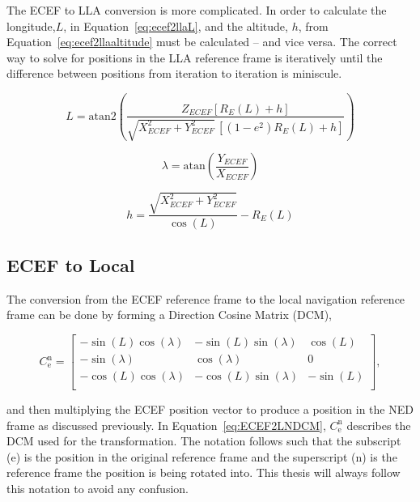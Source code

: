 The ECEF to LLA conversion is more complicated. In order to calculate the longitude,\(L\), in Equation~\ref{eq:ecef2llaL}, and the altitude, \(h\), from Equation~\ref{eq:ecef2llaaltitude} must be calculated {--} and vice versa. The correct way to solve for positions in the LLA reference frame is iteratively until the difference between positions from iteration to iteration is miniscule.

\begin{equation}\label{eq:ecef2llaL}
    L = \textrm{atan2}\left(\frac{Z_{ECEF} \left[R_E (L) + h\right]}{\sqrt{X_{ECEF}^2 + Y^2_{ECEF}} \, \left[ \left(1 - e^2\right) R_E (L) + h\right]}\right)
\end{equation}

\begin{equation}\label{eq:ecef2llalambda}
    \lambda = \textrm{atan}\left(\frac{Y_{ECEF}}{X_{ECEF}}\right)
\end{equation}

\begin{equation}\label{eq:ecef2llaaltitude}
    h = \frac{\sqrt{X_{ECEF}^2 + Y^2_{ECEF}}}{\cos\left(L\right)} - R_E (L)
\end{equation}


\subsection{\textbf{ECEF to Local}}
The conversion from the ECEF reference frame to the local navigation reference frame can be done by forming a Direction Cosine Matrix (DCM),

\begin{equation}\label{eq:ECEF2LNDCM}
    C^{\textrm{n}}_{\textrm{e}} =
    \begin{bmatrix}
        -\sin\left(L\right)\cos\left(\lambda\right) & -\sin\left(L\right)\sin\left(\lambda\right) & \cos\left(L\right)  \\
        -\sin\left(\lambda\right)                   & \cos\left(\lambda\right)                    & 0                   \\
        -\cos\left(L\right)\cos\left(\lambda\right) & -\cos\left(L\right)\sin\left(\lambda\right) & -\sin\left(L\right) \\
    \end{bmatrix},
\end{equation}

and then multiplying the ECEF position vector to produce a position in the NED frame as discussed previously. In Equation~\ref{eq:ECEF2LNDCM}, \(C^{\textrm{n}}_{\textrm{e}}\) describes the DCM used for the transformation. The notation follows such that the subscript (e) is the position in the original reference frame and the superscript (n) is the reference frame the position is being rotated into. This thesis will always follow this notation to avoid any confusion.

